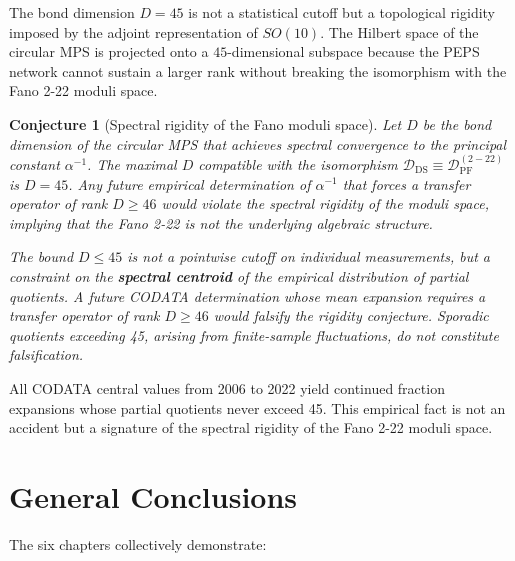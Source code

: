\documentclass[12pt]{article}
\numberwithin{equation}{section}
\newtheorem{conjecture}[theorem]{Conjecture}
\begin{document}
The bond dimension \(D = 45\) is not a statistical cutoff but a topological rigidity imposed by the adjoint representation of \(SO(10)\). The Hilbert space of the circular MPS is projected onto a \(45\)-dimensional subspace because the PEPS network cannot sustain a larger rank without breaking the isomorphism with the Fano 2-22 moduli space.

\begin{conjecture}[Spectral rigidity of the Fano moduli space]\label{conj:rigidity}
Let \(D\) be the bond dimension of the circular MPS that achieves spectral convergence to the principal constant \(\alpha^{-1}\). The maximal \(D\) compatible with the isomorphism \(\mathcal{D}_{\text{DS}} \equiv \mathcal{D}_{\text{PF}}^{(2-22)}\) is \(D = 45\). Any future empirical determination of \(\alpha^{-1}\) that forces a transfer operator of rank \(D \ge 46\) would violate the spectral rigidity of the moduli space, implying that the Fano 2-22 is not the underlying algebraic structure.

The bound \(D \le 45\) is not a pointwise cutoff on individual measurements, but a constraint on the \textbf{spectral centroid} of the empirical distribution of partial quotients. A future CODATA determination whose mean expansion requires a transfer operator of rank \(D \ge 46\) would falsify the rigidity conjecture. Sporadic quotients exceeding 45, arising from finite-sample fluctuations, do not constitute falsification.
\end{conjecture}

All CODATA central values from 2006 to 2022 yield continued fraction expansions whose partial quotients never exceed 45. This empirical fact is not an accident but a signature of the spectral rigidity of the Fano 2-22 moduli space.

\newpage

\section*{General Conclusions}

The six chapters collectively demonstrate:
\end{document}
